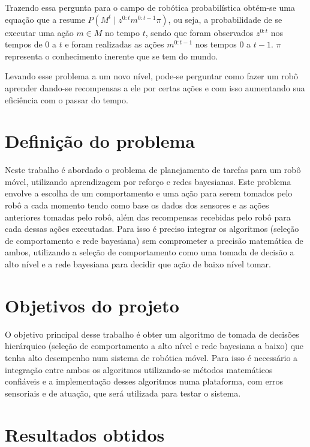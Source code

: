 Trazendo essa pergunta para o campo de robótica probabilística obtém-se uma equação que a resume $ P \left( M^t \mid z^{0: t} m^{0: t -1} \pi \right) $, ou seja, a probabilidade de se executar uma ação $ m \in M $ no tempo $ t $, sendo que foram observados $ z^{0:t} $ nos tempos de $ 0 $ a $ t $ e foram realizadas as ações $ m^{0:t-1} $ nos tempos $ 0 $ a $ t-1 $. $ \pi $ representa o conhecimento inerente que se tem do mundo.

Levando esse problema a um novo nível, pode-se perguntar como fazer um robô aprender dando-se recompensas a ele por certas ações e com isso aumentando sua eficiência com o passar do tempo.


\section{Definição do problema}

Neste trabalho é abordado o problema de planejamento de tarefas para um robô móvel, utilizando aprendizagem por reforço e redes bayesianas. Este problema envolve a escolha de um comportamento e uma ação para serem tomados pelo robô a cada momento tendo como base os dados dos sensores e as ações anteriores tomadas pelo robô, além das recompensas recebidas pelo robô para cada dessas ações executadas. Para isso é preciso integrar os algoritmos (seleção de comportamento e rede bayesiana) sem comprometer a precisão matemática de ambos, utilizando a seleção de comportamento como uma tomada de decisão a alto nível e a rede bayesiana para decidir que ação de baixo nível tomar.


\section{Objetivos do projeto}

O objetivo principal desse trabalho é obter um algoritmo de tomada de decisões hierárquico (seleção de comportamento a alto nível e rede bayesiana a baixo) que tenha alto desempenho num sistema de robótica móvel. Para isso é necessário a integração entre ambos os algoritmos utilizando-se métodos matemáticos confiáveis e a implementação desses algoritmos numa plataforma, com erros sensoriais e de atuação, que será utilizada para testar o sistema.


\section{Resultados obtidos}

